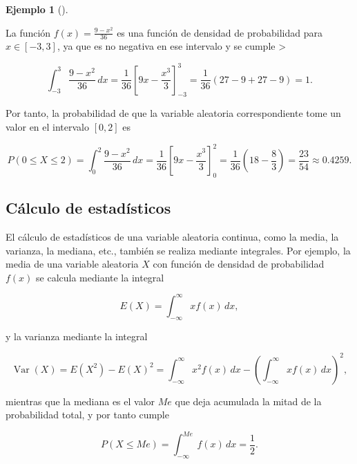 \documentclass[
  a4paper,
]{scrreport}
\theoremstyle{definition}
\newtheorem{example}{Ejemplo}[chapter]
\theoremstyle{plain}
\theoremstyle{definition}
\theoremstyle{definition}
\theoremstyle{plain}
\theoremstyle{plain}
\theoremstyle{remark}
\begin{document}
\begin{example}[]\protect\hypertarget{exm-funcion-densidad}{}\label{exm-funcion-densidad}

La función \(f(x)=\frac{9-x^2}{36}\) es una función de densidad de
probabilidad para \(x\in[-3,3]\), ya que es no negativa en ese intervalo
y se cumple \textgreater{}

\[
\int_{-3}^{3} \frac{9-x^2}{36}\,dx = \frac{1}{36}\left[9x-\frac{x^3}{3}\right]_{-3}^{3} = \frac{1}{36}(27 - 9 + 27 - 9) = 1.
\]

Por tanto, la probabilidad de que la variable aleatoria correspondiente
tome un valor en el intervalo \([0,2]\) es

\[
P(0\leq X\leq 2) = \int_0^2 \frac{9-x^2}{36}\,dx = \frac{1}{36}\left[9x-\frac{x^3}{3}\right]_0^2 = \frac{1}{36}(18 - \frac{8}{3}) = \frac{23}{54}\approx 0.4259.
\]

\end{example}

\subsection{Cálculo de
estadísticos}\label{cuxe1lculo-de-estaduxedsticos}

El cálculo de estadísticos de una variable aleatoria continua, como la
media, la varianza, la mediana, etc., también se realiza mediante
integrales. Por ejemplo, la media de una variable aleatoria \(X\) con
función de densidad de probabilidad \(f(x)\) se calcula mediante la
integral

\[
E(X) = \int_{-\infty}^{\infty} x f(x)\,dx,
\]

y la varianza mediante la integral

\[
\operatorname{Var}(X) = E(X^2) - E(X)^2 = \int_{-\infty}^{\infty} x^2 f(x)\,dx - \left(\int_{-\infty}^{\infty} x f(x)\,dx\right)^2,
\]

mientras que la mediana es el valor \(Me\) que deja acumulada la mitad
de la probabilidad total, y por tanto cumple

\[
P(X\leq Me) = \int_{-\infty}^{Me} f(x)\,dx = \frac{1}{2}.
\]
\end{document}
